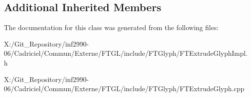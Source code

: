 \subsection*{Additional Inherited Members}


The documentation for this class was generated from the following files\-:\begin{DoxyCompactItemize}
\item 
X\-:/\-Git\-\_\-\-Repository/inf2990-\/06/\-Cadriciel/\-Commun/\-Externe/\-F\-T\-G\-L/include/\-F\-T\-Glyph/F\-T\-Extrude\-Glyph\-Impl.\-h\item 
X\-:/\-Git\-\_\-\-Repository/inf2990-\/06/\-Cadriciel/\-Commun/\-Externe/\-F\-T\-G\-L/include/\-F\-T\-Glyph/F\-T\-Extrude\-Glyph.\-cpp\end{DoxyCompactItemize}
